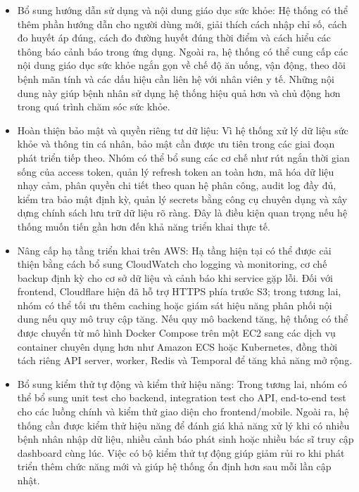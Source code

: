 \begin{itemize}
    \item Bổ sung hướng dẫn sử dụng và nội dung giáo dục sức khỏe: Hệ thống có thể thêm phần hướng dẫn cho người dùng mới, giải thích cách nhập chỉ số, cách đo huyết áp đúng, cách đo đường huyết đúng thời điểm và cách hiểu các thông báo cảnh báo trong ứng dụng. Ngoài ra, hệ thống có thể cung cấp các nội dung giáo dục sức khỏe ngắn gọn về chế độ ăn uống, vận động, theo dõi bệnh mãn tính và các dấu hiệu cần liên hệ với nhân viên y tế. Những nội dung này giúp bệnh nhân sử dụng hệ thống hiệu quả hơn và chủ động hơn trong quá trình chăm sóc sức khỏe.

    \item Hoàn thiện bảo mật và quyền riêng tư dữ liệu: Vì hệ thống xử lý dữ liệu sức khỏe và thông tin cá nhân, bảo mật cần được ưu tiên trong các giai đoạn phát triển tiếp theo. Nhóm có thể bổ sung các cơ chế như rút ngắn thời gian sống của access token, quản lý refresh token an toàn hơn, mã hóa dữ liệu nhạy cảm, phân quyền chi tiết theo quan hệ phân công, audit log đầy đủ, kiểm tra bảo mật định kỳ, quản lý secrets bằng công cụ chuyên dụng và xây dựng chính sách lưu trữ dữ liệu rõ ràng. Đây là điều kiện quan trọng nếu hệ thống muốn tiến gần hơn đến khả năng triển khai thực tế.

    \item Nâng cấp hạ tầng triển khai trên AWS: Hạ tầng hiện tại có thể được cải thiện bằng cách bổ sung CloudWatch cho logging và monitoring, cơ chế backup định kỳ cho cơ sở dữ liệu và cảnh báo khi service gặp lỗi. Đối với frontend, Cloudflare hiện đã hỗ trợ HTTPS phía trước S3; trong tương lai, nhóm có thể tối ưu thêm caching hoặc giám sát hiệu năng phân phối nội dung nếu quy mô truy cập tăng. Nếu quy mô backend tăng, hệ thống có thể được chuyển từ mô hình Docker Compose trên một EC2 sang các dịch vụ container chuyên dụng hơn như Amazon ECS hoặc Kubernetes, đồng thời tách riêng API server, worker, Redis và Temporal để tăng khả năng mở rộng.

    \item Bổ sung kiểm thử tự động và kiểm thử hiệu năng: Trong tương lai, nhóm có thể bổ sung unit test cho backend, integration test cho API, end-to-end test cho các luồng chính và kiểm thử giao diện cho frontend/mobile. Ngoài ra, hệ thống cần được kiểm thử hiệu năng để đánh giá khả năng xử lý khi có nhiều bệnh nhân nhập dữ liệu, nhiều cảnh báo phát sinh hoặc nhiều bác sĩ truy cập dashboard cùng lúc. Việc có bộ kiểm thử tự động giúp giảm rủi ro khi phát triển thêm chức năng mới và giúp hệ thống ổn định hơn sau mỗi lần cập nhật.


\end{itemize}
